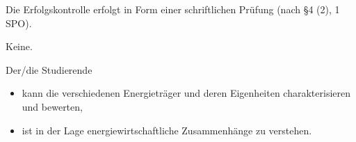 \begin{course}

\setdoclanguagegerman
{}



\coursehead


\label{cour_7409.dp_997}


\begin{styleenv}
\begin{assessment}
Die Erfolgskontrolle erfolgt in Form einer schriftlichen Prüfung (nach §4 (2), 1 SPO).


\end{assessment}

\begin{conditions}Keine.\end{conditions}


\end{styleenv}

\begin{learningoutcomes}
Der/die Studierende

 \begin{itemize}\item kann die verschiedenen Energieträger und deren Eigenheiten charakterisieren und bewerten,  \end{itemize}\begin{itemize}\item ist in der Lage energiewirtschaftliche Zusammenhänge zu verstehen.  \end{itemize}
\end{learningoutcomes}


\end{course}
